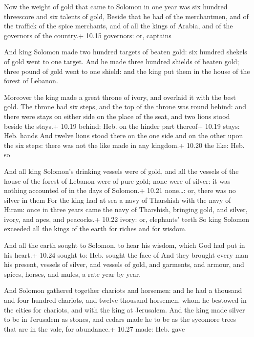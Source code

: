  Now the weight of gold that came to Solomon in one year
was six hundred threescore and six talents of gold,  Beside
that he had of the merchantmen, and of the traffick of the spice
merchants, and of all the kings of Arabia, and of the governors of the
country.+ 10.15 governors: or, captains

 And king Solomon made two hundred targets of beaten
gold: six hundred shekels of gold went to one target.  And
he made three hundred shields of beaten gold; three pound of gold went
to one shield: and the king put them in the house of the forest of
Lebanon.

 Moreover the king made a great throne of ivory, and
overlaid it with the best gold.  The throne had six steps,
and the top of the throne was round behind: and there were stays on
either side on the place of the seat, and two lions stood beside the
stays.+ 10.19 behind: Heb. on the hinder part thereof+ 10.19 stays: Heb.
hands  And twelve lions stood there on the one side and on
the other upon the six steps: there was not the like made in any
kingdom.+ 10.20 the like: Heb. so

 And all king Solomon's drinking vessels were of gold,
and all the vessels of the house of the forest of Lebanon were of pure
gold; none were of silver: it was nothing accounted of in the days of
Solomon.+ 10.21 none\ldots: or, there was no silver in them
 For the king had at sea a navy of Tharshish with the navy
of Hiram: once in three years came the navy of Tharshish, bringing gold,
and silver, ivory, and apes, and peacocks.+ 10.22 ivory: or, elephants'
teeth  So king Solomon exceeded all the kings of the earth
for riches and for wisdom.

 And all the earth sought to Solomon, to hear his wisdom,
which God had put in his heart.+ 10.24 sought to: Heb. sought the face
of  And they brought every man his present, vessels of
silver, and vessels of gold, and garments, and armour, and spices,
horses, and mules, a rate year by year.

 And Solomon gathered together chariots and horsemen: and
he had a thousand and four hundred chariots, and twelve thousand
horsemen, whom he bestowed in the cities for chariots, and with the king
at Jerusalem.  And the king made silver to be in Jerusalem
as stones, and cedars made he to be as the sycomore trees that are in
the vale, for abundance.+ 10.27 made: Heb. gave

